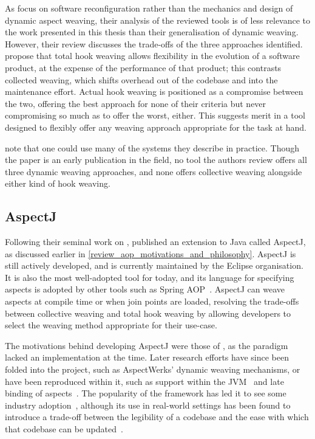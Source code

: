 As \citeauthor{dynamicAOchitchyan} focus on software reconfiguration rather than
the mechanics and design of dynamic aspect weaving, their analysis of the
reviewed tools is of less relevance to the work presented in this thesis than
their generalisation of dynamic weaving. However, their review discusses the
trade-offs of the three approaches identified. \citeauthor{dynamicAOchitchyan}
propose that total hook weaving allows flexibility in the evolution of a
software product, at the expense of the performance of that product; this
contrasts collected weaving, which shifts overhead out of the codebase and into
the maintenance effort. Actual hook weaving is positioned as a compromise
between the two, offering the best approach for none of their criteria but never
compromising so much as to offer the worst, either. This suggests merit in a
tool designed to flexibly offer any weaving approach appropriate for the task at
hand.

\citeauthor{dynamicAOchitchyan} note that one could use many of
the systems they describe in practice. Though the paper is an early publication
in the field, no tool the authors review offers all three dynamic weaving
approaches, and none offers collective weaving alongside either kind of hook
weaving.

\subsection{AspectJ}

Following their seminal work on \aspectorientation{}, \citet{aspectj_intro}
published an \aop{} extension to Java called AspectJ, as discussed earlier in
\cref{review_aop_motivations_and_philosophy}. AspectJ is still actively
developed, and is currently maintained by the Eclipse organisation. It is also
the most well-adopted tool for \aop{} today, and its language for specifying
aspects is adopted by other tools such as Spring
AOP~\cite{introducing_spring_aop_chapter_integration_with_aspectj}. AspectJ can
weave aspects at compile time or when join points are loaded, resolving the
trade-offs between collective weaving and total hook weaving by allowing
developers to select the weaving method appropriate for their use-case.

The motivations behind developing AspectJ were those of \aop{}, as the paradigm
lacked an implementation at the time. Later \aspectorientation{} research
efforts have since been folded into the project, such as AspectWerks' dynamic
weaving mechanisms, or have been reproduced within it, such as support within
the JVM~\cite{golbeck2008lightweight} and late binding of
aspects~\cite{golbeck2010late}. The popularity of the framework has led it to
see some industry adoption~\cite{aspectj_in_industrial_projects}, although its
use in real-world settings has been found to introduce a trade-off between the
legibility of a codebase and the ease with which that codebase can be
updated~\cite{przybylek2018empirical}.

